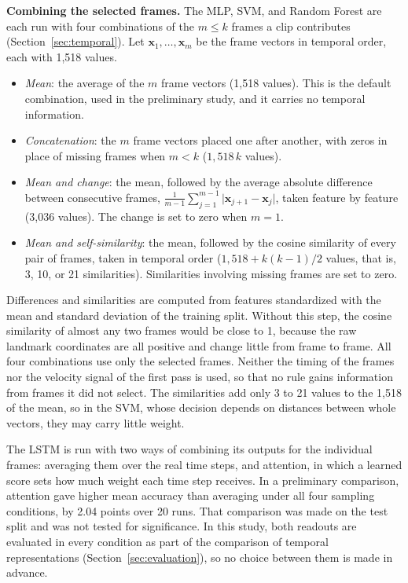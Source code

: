 \textbf{Combining the selected frames.} The MLP, SVM, and Random Forest are each run with four combinations of the $m \le k$ frames a clip contributes (Section~\ref{sec:temporal}). Let $\mathbf{x}_1, \dots, \mathbf{x}_m$ be the frame vectors in temporal order, each with 1,518 values.
\begin{itemize}
   \item \emph{Mean}: the average of the $m$ frame vectors (1,518 values). This is the default combination, used in the preliminary study, and it carries no temporal information.
   \item \emph{Concatenation}: the $m$ frame vectors placed one after another, with zeros in place of missing frames when $m < k$ ($1{,}518\,k$ values).
   \item \emph{Mean and change}: the mean, followed by the average absolute difference between consecutive frames, $\frac{1}{m-1}\sum_{j=1}^{m-1} \lvert \mathbf{x}_{j+1} - \mathbf{x}_j \rvert$, taken feature by feature (3,036 values). The change is set to zero when $m = 1$.
   \item \emph{Mean and self-similarity}: the mean, followed by the cosine similarity of every pair of frames, taken in temporal order ($1{,}518 + k(k-1)/2$ values, that is, 3, 10, or 21 similarities). Similarities involving missing frames are set to zero.
\end{itemize}
Differences and similarities are computed from features standardized with the mean and standard deviation of the training split. Without this step, the cosine similarity of almost any two frames would be close to 1, because the raw landmark coordinates are all positive and change little from frame to frame. All four combinations use only the selected frames. Neither the timing of the frames nor the velocity signal of the first pass is used, so that no rule gains information from frames it did not select. The similarities add only 3 to 21 values to the 1,518 of the mean, so in the SVM, whose decision depends on distances between whole vectors, they may carry little weight.

The LSTM is run with two ways of combining its outputs for the individual frames: averaging them over the real time steps, and attention, in which a learned score sets how much weight each time step receives. In a preliminary comparison, attention gave higher mean accuracy than averaging under all four sampling conditions, by 2.04 points over 20 runs. That comparison was made on the test split and was not tested for significance. In this study, both readouts are evaluated in every condition as part of the comparison of temporal representations (Section~\ref{sec:evaluation}), so no choice between them is made in advance.

